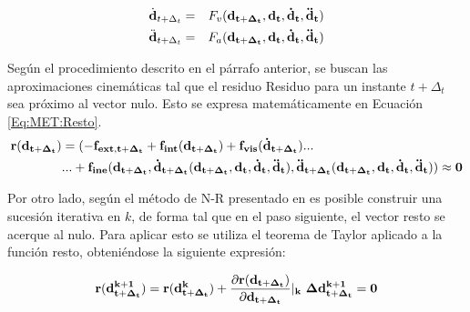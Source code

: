 \begin{eqnarray}\label{Eq:MET:AproxVel}
\dot{\bf{d}}_{t+\Delta_t}&=&F_v(\bf{d_{t+\Delta_t}},\bf{d_t},\bf{\dot{d}_t},\bf{\ddot{d}_t})\\
\label{Eq:MET:AproxAcel}
\ddot{\bf{d}}_{t+\Delta_t}&=&F_a(\bf{d_{t+\Delta_t}},\bf{d_t},\bf{\dot{d}_t},\bf{\ddot{d}_t})
\end{eqnarray}

Según el procedimiento descrito en el párrafo anterior, se buscan las aproximaciones cinemáticas tal que el residuo \gls{Residuo} para un instante $t +\Delta_t$ sea próximo al vector nulo. Esto se expresa matemáticamente en Ecuación \eqref{Eq:MET:Resto}.
\begin{equation}\label{Eq:MET:Resto}
\begin{split}
	\bf{r}(\bf{d}_{t+\Delta_t})&=(-\bf{f}_{ext,t+\Delta_t}+\bf{f}_{int}(\bf{d}_{t+\Delta_t})+\bf{f}_{vis}(\dot{\bf{d}}_{t+\Delta_t})...\\	
	&...+\bf{f}_{ine}(\bf{d_{t+\Delta_t}},\dot{\bf{d}}_{t+\Delta_t}(d_{t+\Delta_t},\bf{d_t},\bf{\dot{d}_t},\bf{\ddot{d}_t}),
	\ddot{\bf{d}}_{t+\Delta_t}(d_{t+\Delta_t},\bf{d_t},\bf{\dot{d}_t},\bf{\ddot{d}_t}))
	\approx 0
\end{split}
\end{equation}

Por otro lado, según el método de N-R presentado en \cite{quarteroni2010numerical} es posible construir una sucesión iterativa en  $k$, de forma tal que en el paso siguiente, el vector resto se acerque al nulo. Para aplicar esto se utiliza el teorema de Taylor aplicado a la función resto, obteniéndose la siguiente expresión:

\begin{equation}\label{Eq:MET:Residuo}
	\bf{r}(\bf{d}^{k+1}_{t+\Delta_t})=\bf{r}(\bf{d}^k_{t+\Delta_t}) +
	\frac{\partial  \bf{r}(\bf{d}_{t+\Delta_t})}{\partial
		\bf{d}_{t+\Delta_t}}|_k~\Delta \bf{d}^{k+1}_{t+\Delta_t}=0
\end{equation}

